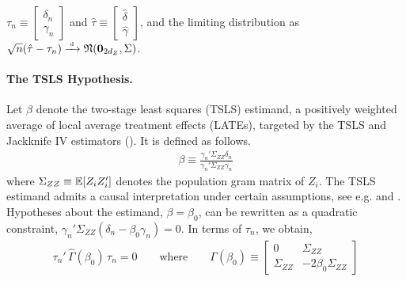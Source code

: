 \(\tau_n \equiv \left[\begin{smallmatrix}
    \delta_n \\ 
    \gamma_n
\end{smallmatrix}\right]\) and 
\(\hat \tau \equiv \left[\begin{smallmatrix}
    \hat \delta \\ 
    \hat \gamma
\end{smallmatrix}\right]\), and
the limiting distribution as \(\sqrt{n}(\hat\tau-\tau_n) \xrightarrow{{\scriptscriptstyle \mathrm{\;d\;}}} \mathfrak{N}(\mathbf{0}_{2d_Z},\Sigma)\). 

\paragraph*{The TSLS Hypothesis.}
Let \(\beta\) denote the two-stage least squares (TSLS) estimand,  a  positively weighted average of local average treatment effects (LATEs), targeted by the TSLS and Jackknife IV estimators (\citealp{kolesarEstimationInstrumentalVariables2013}). It is defined as follows.
\begin{align}
    \beta \equiv \frac{\gamma_n'\Sigma_{ZZ}\delta_n}{\gamma_n'\Sigma_{ZZ}\gamma_n}
\end{align}
where \(\Sigma_{ZZ}\equiv \mathbb{E}[Z_iZ_i']\) denotes the population gram matrix of \(Z_i\).
The TSLS estimand admits a causal interpretation under certain assumptions, see e.g. \cite{angristTwoStageLeastSquares1995} and \cite{mogstadCausalInterpretationTwoStage2021}.
Hypotheses about the estimand, \(\beta=\beta_0\), can be rewritten as a quadratic constraint, \(\gamma_n'\Sigma_{ZZ}(\delta_n -\beta_0\gamma_n) = 0\).
In terms of \(\tau_n\), we obtain,
\begin{align}
    \tau_n'\,\hat\Gamma(\beta_0) \,\tau_n = 0 \qquad \text{where} \qquad
    \Gamma(\beta_0) \equiv 
    \begin{bmatrix}
        0 & \Sigma_{ZZ} \\
        \Sigma_{ZZ} & -2\beta_0\Sigma_{ZZ}
    \end{bmatrix}
\end{align}

